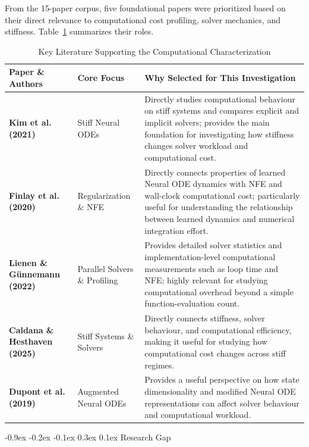 \documentclass[10pt,a4paper]{article}
\makeatletter
\renewcommand{\section}{\@startsection{section}{1}{\z@}%
  {-0.9ex \@plus -0.2ex \@minus -0.1ex}%
  {0.3ex \@plus 0.1ex}%
  {\normalfont\normalsize\bfseries}}
\makeatother
\begin{document}
From the 15-paper corpus, five foundational papers were prioritized based on their direct relevance to computational cost profiling, solver mechanics, and stiffness. Table~\ref{tab:top5} summarizes their roles.

\begin{table}[h!]
\centering
\footnotesize
\renewcommand{\arraystretch}{1.03}
\caption{Key Literature Supporting the Computational Characterization}
\label{tab:top5}
\begin{tabularx}{\textwidth}{p{} p{} X}
\toprule
\textbf{Paper \& Authors} & \textbf{Core Focus} & \textbf{Why Selected for This Investigation} \\
\midrule
\textbf{Kim et al. (2021)} \cite{kim2021stiff} & Stiff Neural ODEs & Directly studies computational behaviour on stiff systems and compares explicit and implicit solvers; provides the main foundation for investigating how stiffness changes solver workload and computational cost. \\
\textbf{Finlay et al. (2020)} \cite{finlay2020train} & Regularization \& NFE & Directly connects properties of learned Neural ODE dynamics with NFE and wall-clock computational cost; particularly useful for understanding the relationship between learned dynamics and numerical integration effort. \\
\textbf{Lienen \& G{\"u}nnemann (2022)} \cite{lienen2022torchode} & Parallel Solvers \& Profiling & Provides detailed solver statistics and implementation-level computational measurements such as loop time and NFE; highly relevant for studying computational overhead beyond a simple function-evaluation count. \\
\textbf{Caldana \& Hesthaven (2025)} \cite{caldana2025neural} & Stiff Systems \& Solvers & Directly connects stiffness, solver behaviour, and computational efficiency, making it useful for studying how computational cost changes across stiff regimes. \\
\textbf{Dupont et al. (2019)} \cite{dupont2019augmented} & Augmented Neural ODEs & Provides a useful perspective on how state dimensionality and modified Neural ODE representations can affect solver behaviour and computational workload. \\
\bottomrule
\end{tabularx}
\end{table}

\section{Research Gap}
\end{document}
